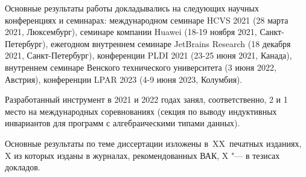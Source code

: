{\probation}
Основные результаты работы докладывались на следующих научных конференциях и семинарах:
международном семинаре HCVS 2021 (28 марта 2021, Люксембург),
семинаре компании Huawei (18-19 ноября 2021, Санкт-Петербург),
ежегодном внутреннем семинаре JetBrains Research (18 декабря 2021, Санкт-Петербург),
конференции PLDI 2021 (23-25 июня 2021, Канада),
внутреннем семинаре Венского технического университета (3 июня 2022, Австрия),
конференции LPAR 2023 (4-9 июня 2023, Колумбия).

Разработанный инструмент в 2021 и 2022 годах занял, соответственно, 2 и 1 место на международных соревнованиях \chccomp{} (секция по выводу индуктивных инвариантов для программ с алгебраическими типами данных).


{%
    {\publications} Основные результаты по теме диссертации изложены
    в~XX~печатных изданиях,
    X из которых изданы в журналах, рекомендованных ВАК,
    X "--- в тезисах докладов.
}%

